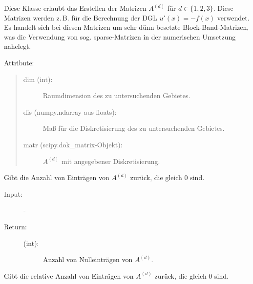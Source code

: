 \documentclass[a4paper,10pt,ngerman, openright]{sphinxmanual}
\begin{document}
\begin{fulllineitems}
\label{\detokenize{index:sparse.Sparse}}
Diese Klasse erlaubt das Erstellen der Matrizen $A^{(d)}$ für $d\in \{ 1,2,3 \}$. Diese Matrizen werden
z.\,B. für die Berechnung der DGL $u'(x)=-f(x)$ verwendet. Es handelt sich bei diesen Matrizen
um sehr dünn besetzte Block-Band-Matrizen, was die Verwendung von sog. sparse-Matrizen
in der numerischen Umsetzung nahelegt.

Attribute:
\begin{quote}
\begin{description}
\item[{dim (int):}] \leavevmode
Raumdimension des zu untersuchenden Gebietes.

\item[{dis (numpy.ndarray aus floats):}] \leavevmode
Maß für die Diskretisierung des zu untersuchenden Gebietes.

\item[{matr (scipy.dok\_matrix-Objekt):}] \leavevmode
$A^{(d)}$ mit angegebener Diskretisierung.

\end{description}
\end{quote}

\begin{fulllineitems}
\label{\detokenize{index:sparse.Sparse.anz_n_abs}}
Gibt die Anzahl von Einträgen von $A^{(d)}$ zurück, die gleich 0 sind.

\begin{description}
\item[{Input:}] -\leavevmode
\item[{Return:}] \leavevmode\begin{description}
\item[{(int):}] \leavevmode
Anzahl von Nulleinträgen von $A^{(d)}$.

\end{description}

\end{description}

\end{fulllineitems}


\begin{fulllineitems}
\label{\detokenize{index:sparse.Sparse.anz_n_rel}}
Gibt die relative Anzahl von Einträgen von $A^{(d)}$ zurück, die gleich 0 sind.


\end{fulllineitems}
\end{fulllineitems}
\end{document}
